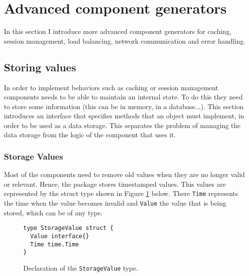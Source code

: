 \section{Advanced component generators}
\label{sec:impl2}
In this section I introduce more advanced component generators for caching,
session management, load balancing, network communication and error handling.

\subsection{Storing values}
In order to implement behaviors such as caching or session management
components needs to be able to maintain an internal state.
To do this they need to store some information (this can be in memory, 
in a database...).
This section introduces an interface that specifies methods that an 
object must implement, in order to be used as a data storage. This 
separates the problem of managing the data storage from the logic of
the component that uses it.

\subsubsection{Storage Values}
Most of the components need to remove old values when they are no longer
valid or relevant. Hence, the package stores timestamped values. 
This values are represented by the struct type shown in Figure 
\ref{fig:StorageValue} below. There \texttt{Time} represents the time 
when the value becomes invalid and \texttt{Value} the value that is being
stored, which can be of any type.
\begin{figure}[h]
\centering
\begin{lstlisting}
type StorageValue struct {
  Value interface{}
  Time time.Time
}
\end{lstlisting}
\caption[scale=1.0]{Declaration of the \texttt{StorageValue} type.}
\label{fig:StorageValue}
\end{figure}

